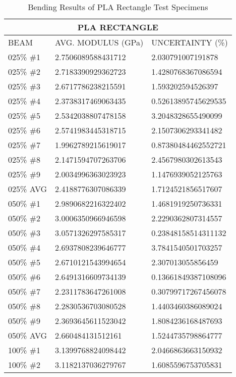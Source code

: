 \begin{longtable}{ | X | X | X | }
	\caption{Bending Results of PLA Rectangle Test Specimens}
	\label{tab:pla_rectangle_data}
	\endhead
	\hline
	\multicolumn{3}{|c|}{PLA RECTANGLE} \\ \hline
	BEAM & AVG. MODULUS (GPa) & UNCERTAINTY (\%) \\ \hline
	025\% \#1 & 2.7506089588431712 & 2.030791007191878 \\ \hline
	025\% \#2 & 2.7183390929362723 & 1.4280768367086594 \\ \hline
	025\% \#3 & 2.6717786238215591 & 1.593202594526397 \\ \hline
	025\% \#4 & 2.3738317469063435 & 0.52613895745629535 \\ \hline
	025\% \#5 & 2.5342038807478158 & 3.2048328655490099 \\ \hline
	025\% \#6 & 2.5741983445318715 & 2.1507306293341482 \\ \hline
	025\% \#7 & 1.9962789215619017 & 0.87380484462552721 \\ \hline
	025\% \#8 & 2.1471594707263706 & 2.4567980302613543 \\ \hline
	025\% \#9 & 2.0034996363023923 & 1.1476939052125763 \\ \hline
	025\% AVG & 2.4188776307086339 & 1.7124521856517607 \\ \hline
	050\% \#1 & 2.9890682216322402 & 1.4681919250736331 \\ \hline
	050\% \#2 & 3.0006350966946598 & 2.2290362807314557 \\ \hline
	050\% \#3 & 3.0571326297585317 & 0.23848158514311132 \\ \hline
	050\% \#4 & 2.6937808239646777 & 3.7841540501703257 \\ \hline
	050\% \#5 & 2.6710121543994654 & 2.307013055856459 \\ \hline
	050\% \#6 & 2.6491316609734139 & 0.13661849387108096 \\ \hline
	050\% \#7 & 2.2311783647261008 & 0.30799717267456078 \\ \hline
	050\% \#8 & 2.2830536703080528 & 1.4403460386089024 \\ \hline
	050\% \#9 & 2.3693645611523042 & 1.8084236168487693 \\ \hline
	050\% AVG & 2.660484131512161 & 1.5244735798864777 \\ \hline
	100\% \#1 & 3.1399768824098442 & 2.0466863663150932 \\ \hline
	100\% \#2 & 3.1182137036279767 & 1.6085596753705831 \\ \hline

\end{longtable}
